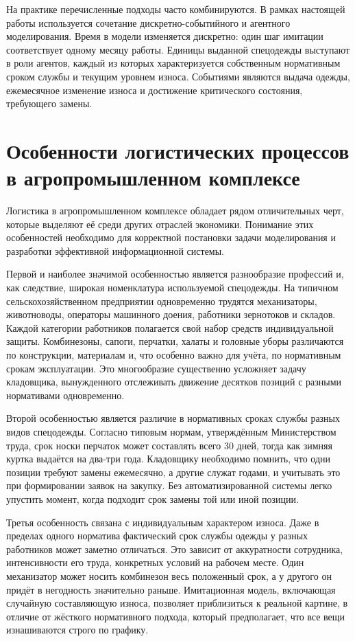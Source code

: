 \documentclass[14pt,a4paper]{extreport}
\begin{document}
\begin{singlespacing}
	На практике перечисленные подходы часто комбинируются. В рамках настоящей работы используется сочетание дискретно-событийного и агентного моделирования. Время в модели изменяется дискретно: один шаг имитации соответствует одному месяцу работы. Единицы выданной спецодежды выступают в роли агентов, каждый из которых характеризуется собственным нормативным сроком службы и текущим уровнем износа. Событиями являются выдача одежды, ежемесячное изменение износа и достижение критического состояния, требующего замены.
	
	\section{Особенности логистических процессов в агропромышленном комплексе}
	
	Логистика в агропромышленном комплексе обладает рядом отличительных черт, которые выделяют её среди других отраслей экономики. Понимание этих особенностей необходимо для корректной постановки задачи моделирования и разработки эффективной информационной системы.
	
	Первой и наиболее значимой особенностью является разнообразие профессий и, как следствие, широкая номенклатура используемой спецодежды. На типичном сельскохозяйственном предприятии одновременно трудятся механизаторы, животноводы, операторы машинного доения, работники зернотоков и складов. Каждой категории работников полагается свой набор средств индивидуальной защиты. Комбинезоны, сапоги, перчатки, халаты и головные уборы различаются по конструкции, материалам и, что особенно важно для учёта, по нормативным срокам эксплуатации. Это многообразие существенно усложняет задачу кладовщика, вынужденного отслеживать движение десятков позиций с разными нормативами одновременно.
	
	Второй особенностью является различие в нормативных сроках службы разных видов спецодежды. Согласно типовым нормам, утверждённым Министерством труда, срок носки перчаток может составлять всего 30 дней, тогда как зимняя куртка выдаётся на два-три года. Кладовщику необходимо помнить, что одни позиции требуют замены ежемесячно, а другие служат годами, и учитывать это при формировании заявок на закупку. Без автоматизированной системы легко упустить момент, когда подходит срок замены той или иной позиции.
	
	Третья особенность связана с индивидуальным характером износа. Даже в пределах одного норматива фактический срок службы одежды у разных работников может заметно отличаться. Это зависит от аккуратности сотрудника, интенсивности его труда, конкретных условий на рабочем месте. Один механизатор может носить комбинезон весь положенный срок, а у другого он придёт в негодность значительно раньше. Имитационная модель, включающая случайную составляющую износа, позволяет приблизиться к реальной картине, в отличие от жёсткого нормативного подхода, который предполагает, что все вещи изнашиваются строго по графику.
	

\end{singlespacing}
\end{document}
